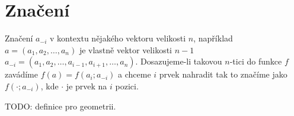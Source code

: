 \section{Značení}
Značení $a_{-i}$ v kontextu nějakého vektoru velikosti $n$, například $a = (a_1, a_2, \dots, a_n)$ je vlastně vektor velikosti $n-1$ $a_{-i} = (a_1, a_2, \dots, a_{i-1}, a_{i+1}, \dots, a_n)$.
Dosazujeme-li takovou $n$-tici do funkce $f$ zavádíme $f(a) = f(a_i; a_{-i})$ a chceme $i$ prvek nahradit tak to značíme jako $f( \cdot ; a_{-i})$, kde $\cdot$ je prvek na $i$ pozici.

TODO: definice pro geometrii.
